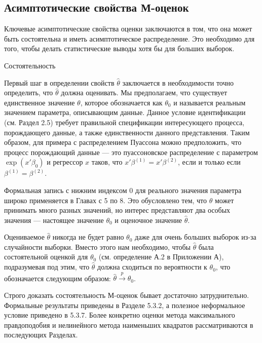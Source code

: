 \subsection{Асимптотические свойства М-оценок}

Ключевые асимптотические свойства оценки заключаются в том, что она может быть состоятельна и иметь асимптотическое распределение. Это необходимо для того, чтобы делать статистические  выводы хотя бы для больших выборок.

\begin{center}
Состоятельность
\end{center}

Первый шаг в определении свойств $\hat{\theta}$ заключается в необходимости точно определить, что $\hat{\theta}$ должна оценивать. Мы предполагаем, что существует единственное значение $\theta$, которое обозначается как $\theta_0$ и называется реальным значением параметра, описывающим данные. Данное условие идентификации (см. Раздел 2.5) требует правильной спецификации интересующего процесса, порождающего данные, а также единственности данного представления. Таким образом, для примера с распределением Пуассона можно предположить, что процесс порождающий данные --- это пуассоновское распределение с параметром $\exp(x'\beta_0)$ и регрессор $x$ таков, что $x'\beta^{(1)}=x'\beta^{(2)}$, если и только если $\beta^{(1)}=\beta^{(2)}$. 

Формальная запись с нижним индексом 0 для реального значения параметра широко применяется в Главах с 5 по 8. Это обусловлено тем, что $\theta$ может принимать много разных значений, но интерес представляют два особых значения --- настоящее значение $\theta_0$ и оценочное значение $\hat{\theta}$.

Оцениваемое $\hat{\theta}$ никогда не будет равно $\theta_0$ даже для очень больших выборок из-за случайности выборки. Вместо этого нам необходимо, чтобы $\hat{\theta}$ была состоятельной оценкой для $\theta_0$ (см. определение А.2 в Приложении А), подразумевая под этим, что $\hat{\theta}$ должна сходиться по вероятности к $\theta_0$, что обозначается следующим образом:  $\hat{\theta} \xrightarrow{p} \theta_0$. 

Строго доказать состоятельность М-оценок бывает достаточно затруднительно. Формальные результаты приведены в Разделе 5.3.2, а полезное неформальное условие приведено в 5.3.7. Более конкретно оценки метода максимального правдоподобия и нелинейного метода наименьших квадратов рассматриваются в последующих Разделах.

